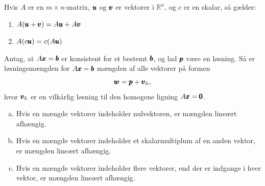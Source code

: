 \begin{theorem}
Hvis \( A \) er en \( m \times n \)-matrix, \( \pmb{u} \) og \( \pmb{v} \) er vektorer i \( \mathbb{R}^n \), og \( c \) er en skalar, så gælder:

\begin{enumerate}[label=(\alph*)]
    \item \( A(\pmb{u} + \pmb{v}) = A \pmb{u} + A \pmb{v} \)  


    \item \( A(c \pmb{u}) = c(A \pmb{u}) \)  

\end{enumerate}
\end{theorem}

\begin{theorem}
    Antag, at $A \pmb{x} = \pmb{b}$ er konsistent for et bestemt $\pmb{b}$, og lad $\pmb{p}$ være en løsning. Så er løsningsmængden for $A \pmb{x} = \pmb{b}$ mængden af alle vektorer på formen
    \[
    \pmb{w} = \pmb{p} + \pmb{v}_h,
    \]
    hvor $\pmb{v}_h$ er en vilkårlig løsning til den homogene ligning $A \pmb{x} = \pmb{0}$.
\end{theorem}

\begin{theorem}
    \begin{enumerate}[(a)]
        \item Hvis en mængde vektorer indeholder nulvektoren, er mængden lineært afhængig.
        \item Hvis en mængde vektorer indeholder et skalarmultiplum af en anden vektor, er mængden lineært afhængig.
        \item Hvis en mængde vektorer indeholder flere vektorer, end der er indgange i hver vektor, er mængden lineært afhængig.
    \end{enumerate}
\end{theorem}


